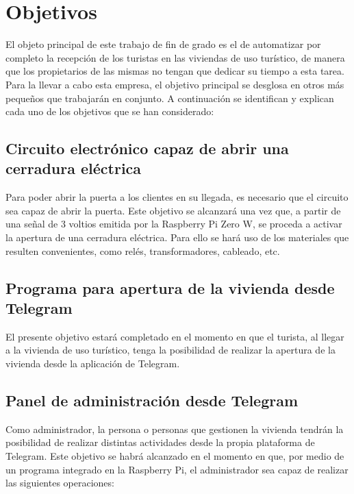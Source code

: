 \chapter{Objetivos}
\label{ch:objetivos}

\noindent El objeto principal de este trabajo de fin de grado es el de automatizar por completo la recepción de los turistas en las viviendas de uso turístico, de manera que los propietarios de las mismas no tengan que dedicar su tiempo a esta tarea. Para la llevar a cabo esta empresa, el objetivo principal se desglosa en otros más pequeños que trabajarán en conjunto. A continuación se identifican y explican cada uno de los objetivos que se han considerado:

\section{Circuito electrónico capaz de abrir una cerradura eléctrica} 
\label{sec:circuito-electronico-capaz-de-abrir-una-cerradura-electrica}

\noindent Para poder abrir la puerta a los clientes en su llegada, es necesario que el circuito sea capaz de abrir la puerta. Este objetivo se alcanzará una vez que, a partir de una señal de 3 voltios emitida por la Raspberry Pi Zero W, se proceda a activar la apertura de una cerradura eléctrica. Para ello se hará uso de los materiales que resulten convenientes, como relés, transformadores, cableado, etc.

\section{Programa para apertura de la vivienda desde Telegram} 
\label{sec:programa-que-atienda-las-peticiones-de-apertura-desde-telegram}

\noindent El presente objetivo estará completado en el momento en que el turista, al llegar a la vivienda de uso turístico, tenga la posibilidad de realizar la apertura de la vivienda desde la aplicación de Telegram.

\section{Panel de administración desde Telegram} 
\label{sec:creacion-de-un-panel-de-administracion-desde-telegram}

\noindent Como administrador, la persona o personas que gestionen la vivienda tendrán la posibilidad de realizar distintas actividades desde la propia plataforma de Telegram. Este objetivo se habrá alcanzado en el momento en que, por medio de un programa integrado en la Raspberry Pi, el administrador sea capaz de realizar las siguientes operaciones:


